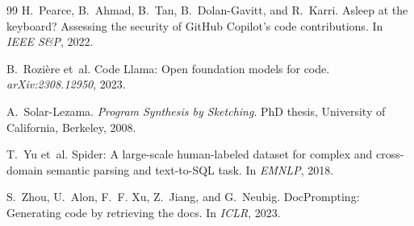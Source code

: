 \documentclass[11pt,a4paper]{article}
\begin{document}
\begin{thebibliography}{99}
H.~Pearce, B.~Ahmad, B.~Tan, B.~Dolan-Gavitt, and R.~Karri.
\newblock Asleep at the keyboard? Assessing the security of GitHub Copilot's
  code contributions.
\newblock In \emph{IEEE S\&P}, 2022.

B.~Rozière et~al.
\newblock Code Llama: Open foundation models for code.
\newblock \emph{arXiv:2308.12950}, 2023.

A.~Solar-Lezama.
\newblock \emph{Program Synthesis by Sketching}.
\newblock PhD thesis, University of California, Berkeley, 2008.

T.~Yu et~al.
\newblock Spider: A large-scale human-labeled dataset for complex and
  cross-domain semantic parsing and text-to-SQL task.
\newblock In \emph{EMNLP}, 2018.

S.~Zhou, U.~Alon, F.~F. Xu, Z.~Jiang, and G.~Neubig.
\newblock DocPrompting: Generating code by retrieving the docs.
\newblock In \emph{ICLR}, 2023.

\end{thebibliography}
\end{document}
